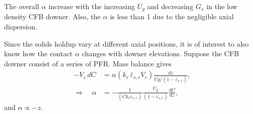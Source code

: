 The overall $\alpha$ increase with the increasing $U_g$ and decreasing $G_s$ in the low density CFB downer.
Also, the $\alpha$ is less than 1 due to the negligible axial dispersion.

Since the solids holdup vary at different axial positions, it is of interest to also know how the contact $\alpha$ changes with downer elevations.
Suppose the CFB downer consist of a series of PFR.
Mass balance gives
\begin{align}
    -V_c \, dC
           & = \alpha(k_r\, \bar{\varepsilon}_{s,r} V_c) \frac{dz}{Ug/(1-\bar{\varepsilon}_{s,r})}, \\
    \Longrightarrow \quad
    \alpha & = -
    \frac{1}{(C k_r \bar{\varepsilon}_{s,r})}
    \frac{U_g}{(1-\bar{\varepsilon}_{s,r})}
    \frac{dC}{dz},
\end{align}
and $\alpha \propto - z$.
